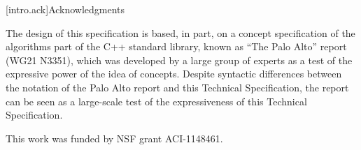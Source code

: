 


[intro.ack]{Acknowledgments}

\pnum
The design of this specification is based, in part, on a concept 
specification of the algorithms part of the C++ standard library, known 
as ``The Palo Alto'' report (WG21 N3351), which was developed by a large 
group of experts as a test of the expressive power of the idea of 
concepts. Despite syntactic differences between the notation of the 
Palo Alto report and this Technical Specification, the report can be seen as a 
large-scale test of the expressiveness of this Technical Specification.

\pnum
This work was funded by NSF grant ACI-1148461.
